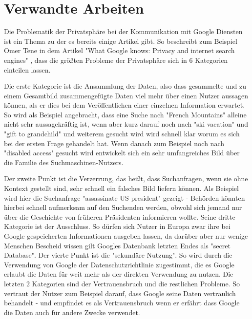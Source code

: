 % 
% 

\chapter{Verwandte Arbeiten}
Die Problematik der Privatsphäre bei der Kommunikation mit Google Diensten ist ein Thema zu der es bereits einige Artikel gibt. So beschreibt zum Beispiel Omer Tene in dem Artikel "What Google knows: Privacy and internet search engines" \cite{tene2007google}, dass die größten Probleme der Privatsphäre sich in 6 Kategorien einteilen lassen.

Die erste Kategorie ist die Ansammlung der Daten, also dass gesammelte und zu einem Gesamtbild zusammengefügte Daten viel mehr über einen Nutzer aussagen können, als er dies bei dem Veröffentlichen einer einzelnen Information erwartet. So wird als Beispiel angebracht, dass eine Suche nach "French Mountains" alleine nicht sehr aussagekräftig ist, wenn aber kurz darauf noch nach "ski vacation" und "gift to grandchild" und weiterem gesucht wird wird schnell klar worum es sich bei der ersten Frage gehandelt hat. Wenn danach zum Beispiel noch nach "disabled access" gesucht wird entwickelt sich ein sehr umfangreiches Bild über die Familie des Suchmaschinen-Nutzers. 

Der zweite Punkt ist die Verzerrung, das heißt, dass Suchanfragen, wenn sie ohne Kontext gestellt sind, sehr schnell ein falsches Bild liefern können. Als Beispiel wird hier die Suchanfrage "assassinate US president" gezeigt - Behörden könnten hierbei schnell aufmerksam auf den Suchenden werden, obwohl sich jemand nur über die Geschichte von früheren Präsidenten informieren wollte.
Seine dritte Kategorie ist der Ausschluss. So dürfen sich Nutzer in Europa zwar ihre bei Google gespeicherten Informationen ausgeben lassen, da darüber aber nur wenige Menschen Bescheid wissen gilt Googles Datenbank letzten Endes als "secret Database". 
Der vierte Punkt ist die "sekundäre Nutzung". So wird durch die Verwendung von Google der Datenschutzrichtlinie zugestimmt, die es Google erlaubt die Daten für weit mehr als der direkten Verwendung zu nutzen. Die letzten 2 Kategorien sind der Vertrauensbruch und die restlichen Probleme. So vertraut der Nutzer zum Beispiel darauf, dass Google seine Daten vertraulich behandelt - und empfindet es als Vertrauensbruch wenn er erfährt dass Google die Daten auch für andere Zwecke verwendet.

